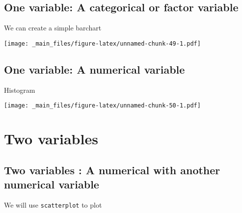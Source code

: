 \documentclass[]{book}
\newenvironment{Shaded}{\begin{snugshade}}{\end{snugshade}}
\newcommand{\KeywordTok}[1]{\textcolor[rgb]{0.13,0.29,0.53}{\textbf{{#1}}}}
\newcommand{\DataTypeTok}[1]{\textcolor[rgb]{0.13,0.29,0.53}{{#1}}}
\newcommand{\StringTok}[1]{\textcolor[rgb]{0.31,0.60,0.02}{{#1}}}
\newcommand{\NormalTok}[1]{{#1}}
\theoremstyle{definition}
\theoremstyle{definition}
\theoremstyle{remark}
\begin{document}
\subsection{One variable: A categorical or factor
variable}\label{one-variable-a-categorical-or-factor-variable}

We can create a simple barchart

\begin{Shaded}
\end{Shaded}

\texttt{[image: \_main\_files/figure-latex/unnamed-chunk-49-1.pdf]}

\subsection{One variable: A numerical
variable}\label{one-variable-a-numerical-variable}

Histogram

\begin{Shaded}
\end{Shaded}

\texttt{[image: \_main\_files/figure-latex/unnamed-chunk-50-1.pdf]}

\section{Two variables}\label{two-variables}

\subsection{Two variables : A numerical with another numerical
variable}\label{two-variables-a-numerical-with-another-numerical-variable}

We will use \texttt{scatterplot} to plot
\end{document}
